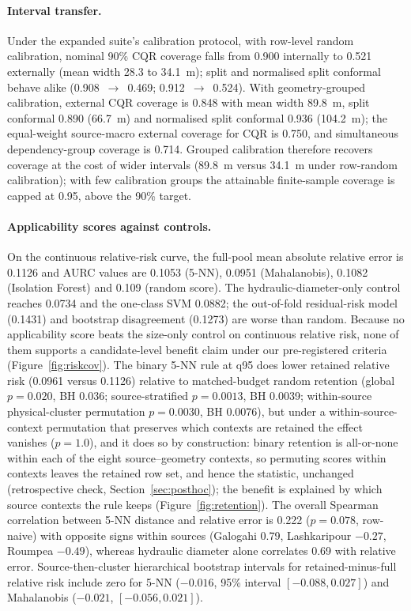 \documentclass[11pt,a4paper]{article}
\newcommand{\um}{\textmu m}
\begin{document}
\paragraph{Interval transfer.} Under the expanded suite's calibration protocol, with row-level random calibration, nominal 90\% CQR coverage falls from 0.900 internally to 0.521 externally (mean width
28.3 to 34.1~\um); split and normalised split conformal behave alike
(0.908~$\to$~0.469; 0.912~$\to$~0.524). With geometry-grouped calibration,
external CQR coverage is 0.848 with mean width 89.8~\um{}, split conformal
0.890 (66.7~\um) and normalised split conformal 0.936 (104.2~\um); the
equal-weight source-macro external coverage for CQR is 0.750, and simultaneous
dependency-group coverage is 0.714. Grouped calibration therefore recovers
coverage at the cost of wider intervals (89.8~\um{} versus 34.1~\um{} under
row-random calibration); with few calibration groups the attainable
finite-sample coverage is capped at 0.95, above the 90\% target.

\paragraph{Applicability scores against controls.} On the continuous
relative-risk curve, the full-pool mean absolute relative error is 0.1126 and
AURC values are 0.1053 (5-NN), 0.0951 (Mahalanobis), 0.1082 (Isolation
Forest) and 0.109 (random score). The hydraulic-diameter-only control reaches
0.0734 and the one-class SVM 0.0882; the out-of-fold residual-risk model
(0.1431) and bootstrap disagreement (0.1273) are worse than random. Because
no applicability score beats the size-only control on continuous relative
risk, none of them supports a candidate-level benefit claim under our
pre-registered criteria (Figure~\ref{fig:riskcov}). The binary 5-NN
rule at q95 does lower retained relative risk (0.0961 versus 0.1126) relative
to matched-budget random retention (global $p=0.020$, BH 0.036;
source-stratified $p=0.0013$, BH 0.0039; within-source physical-cluster
permutation $p=0.0030$, BH 0.0076), but under a within-source-context
permutation that preserves which contexts are retained the effect vanishes
($p=1.0$), and it does so by construction: binary retention is all-or-none
within each of the eight source--geometry contexts, so permuting scores
within contexts leaves the retained row set, and hence the statistic,
unchanged (retrospective check, Section~\ref{sec:posthoc}); the benefit is
explained by which source contexts the rule keeps
(Figure~\ref{fig:retention}). The overall Spearman correlation between 5-NN
distance and relative error is 0.222 ($p=0.078$, row-naive) with opposite
signs within sources (Galogahi 0.79, Lashkaripour $-0.27$, Roumpea $-0.49$),
whereas hydraulic diameter alone correlates 0.69 with relative error.
Source-then-cluster hierarchical bootstrap intervals for retained-minus-full
relative risk include zero for 5-NN ($-0.016$, 95\% interval
$[-0.088, 0.027]$) and Mahalanobis ($-0.021$, $[-0.056, 0.021]$).
\end{document}
